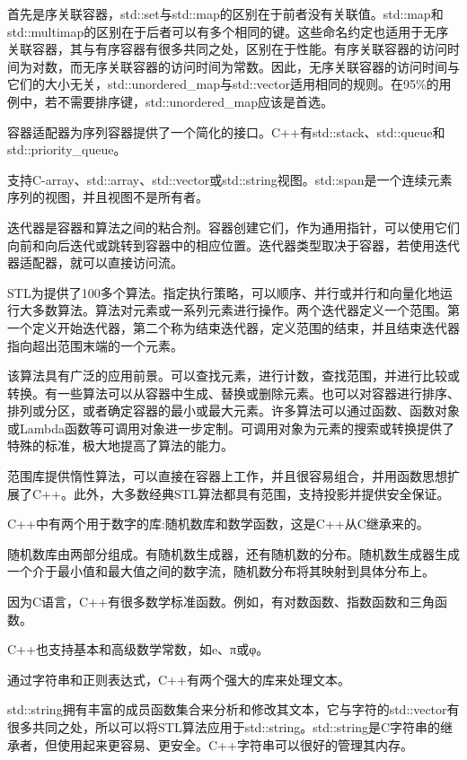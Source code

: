 首先是序关联容器，std::set与std::map的区别在于前者没有关联值。std::map和std::multimap的区别在于后者可以有多个相同的键。这些命名约定也适用于无序关联容器，其与有序容器有很多共同之处，区别在于性能。有序关联容器的访问时间为对数，而无序关联容器的访问时间为常数。因此，无序关联容器的访问时间与它们的大小无关，std::unordered\_map与std::vector适用相同的规则。在95\%的用例中，若不需要排序键，std::unordered\_map应该是首选。

容器适配器为序列容器提供了一个简化的接口。C++有std::stack、std::queue和std::priority\_queue。

支持C-array、std::array、std::vector或std::string视图。std::span是一个连续元素序列的视图，并且视图不是所有者。

迭代器是容器和算法之间的粘合剂。容器创建它们，作为通用指针，可以使用它们向前和向后迭代或跳转到容器中的相应位置。迭代器类型取决于容器，若使用迭代器适配器，就可以直接访问流。

STL为提供了100多个算法。指定执行策略，可以顺序、并行或并行和向量化地运行大多数算法。算法对元素或一系列元素进行操作。两个迭代器定义一个范围。第一个定义开始迭代器，第二个称为结束迭代器，定义范围的结束，并且结束迭代器指向超出范围末端的一个元素。

该算法具有广泛的应用前景。可以查找元素，进行计数，查找范围，并进行比较或转换。有一些算法可以从容器中生成、替换或删除元素。也可以对容器进行排序、排列或分区，或者确定容器的最小或最大元素。许多算法可以通过函数、函数对象或Lambda函数等可调用对象进一步定制。可调用对象为元素的搜索或转换提供了特殊的标准，极大地提高了算法的能力。

范围库提供惰性算法，可以直接在容器上工作，并且很容易组合，并用函数思想扩展了C++。此外，大多数经典STL算法都具有范围，支持投影并提供安全保证。


C++中有两个用于数字的库:随机数库和数学函数，这是C++从C继承来的。

随机数库由两部分组成。有随机数生成器，还有随机数的分布。随机数生成器生成一个介于最小值和最大值之间的数字流，随机数分布将其映射到具体分布上。

因为C语言，C++有很多数学标准函数。例如，有对数函数、指数函数和三角函数。

C++也支持基本和高级数学常数，如e、π或φ。


通过字符串和正则表达式，C++有两个强大的库来处理文本。

std::string拥有丰富的成员函数集合来分析和修改其文本，它与字符的std::vector有很多共同之处，所以可以将STL算法应用于std::string。std::string是C字符串的继承者，但使用起来更容易、更安全。C++字符串可以很好的管理其内存。

